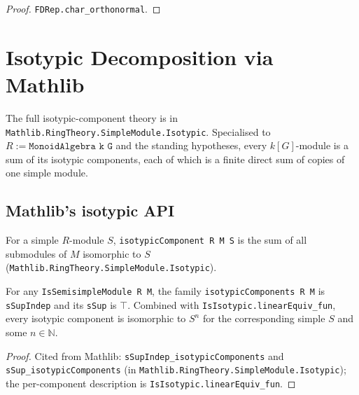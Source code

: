 \begin{proof}\leanok{}
  \texttt{FDRep.char\_orthonormal}.
\end{proof}


\chapter{Isotypic Decomposition via Mathlib}
\label{chap:isotypic}

The full isotypic-component theory is in
\texttt{Mathlib.RingTheory.SimpleModule.Isotypic}.  Specialised to
$R := \texttt{MonoidAlgebra k G}$ and the standing hypotheses, every
$k[G]$-module is a sum of its isotypic components, each of which is a finite
direct sum of copies of one simple module.

\section{Mathlib's isotypic API}

\begin{definition}
  \label{def:isotypicComponent}
  \mathlibok
  For a simple $R$-module $S$, \texttt{isotypicComponent R M S} is the sum
  of all submodules of $M$ isomorphic to $S$
  (\texttt{Mathlib.RingTheory.SimpleModule.Isotypic}).
\end{definition}

\begin{theorem}
  \label{thm:isotypic-decomp}
  \mathlibok
  \leanok
  For any \texttt{IsSemisimpleModule R M}, the family
  \texttt{isotypicComponents R M} is \texttt{sSupIndep} and its \texttt{sSup}
  is $\top$. Combined with \texttt{IsIsotypic.linearEquiv\_fun}, every
  isotypic component is isomorphic to $S^n$ for the corresponding simple $S$
  and some $n \in \mathbb N$.
\end{theorem}

\begin{proof}\leanok{}
  Cited from Mathlib: \texttt{sSupIndep\_isotypicComponents} and
  \texttt{sSup\_isotypicComponents} (in
  \texttt{Mathlib.RingTheory.SimpleModule.Isotypic}); the per-component
  description is \texttt{IsIsotypic.linearEquiv\_fun}.
\end{proof}

